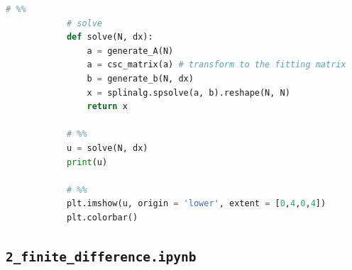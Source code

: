 \documentclass[12pt]{article}
\begin{document}
\begin{lstlisting}[language={Python}]
            # %%
            # solve
            def solve(N, dx):
                a = generate_A(N)
                a = csc_matrix(a) # transform to the fitting matrix
                b = generate_b(N, dx)
                x = splinalg.spsolve(a, b).reshape(N, N)
                return x
            
            # %%
            u = solve(N, dx)
            print(u)
            
            # %%
            plt.imshow(u, origin = 'lower', extent = [0,4,0,4])
            plt.colorbar()            
        \end{lstlisting}


    \subsection{\texttt{2\_finite\_difference.ipynb}}
\end{document}
